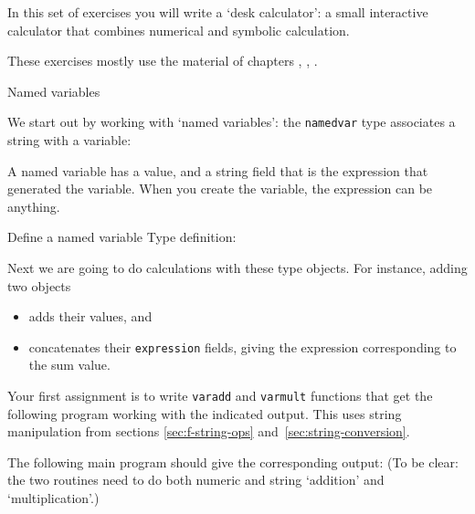 
In this set of exercises you will write a `desk calculator':
a small interactive calculator
that combines numerical and symbolic calculation.

These exercises mostly use the material of chapters
, , .

 {Named variables}

We start out by working with `named variables':
the \lstinline{namedvar} type associates a string with a variable:
%

A named variable has a value, and a string field that is the expression
that generated the variable.
When you create the variable, the expression can be anything.
%

\begin{slide}{Define a named variable}
  \label{sl:f-named-var-def}
  Type definition:
\end{slide}

Next we are going to do calculations with these type objects.
For instance, adding two objects
\begin{itemize}
\item
  adds their values, and
\item concatenates their \lstinline{expression} fields,
  giving the expression corresponding to the sum value.
\end{itemize}

Your first assignment is to write
\lstinline{varadd} and \lstinline{varmult} functions
that get the following program working
with the indicated output.
This uses string manipulation from sections
\ref{sec:f-string-ops} and~\ref{sec:string-conversion}.

\begin{exercise}
  \label{ex:f-named-var}
  The following main program should give the corresponding output:
  \def\snippetcodefraction{.4}
  \def\snippetanswfraction{.6}
  (To be clear: the two routines need to do both numeric and string
  `addition' and `multiplication'.)
\end{exercise}

